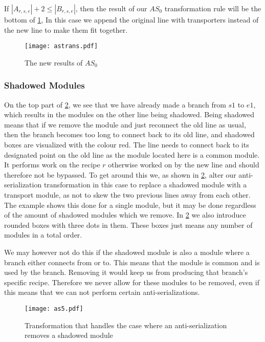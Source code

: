 If $|A_{r,s,e}| + 2 \leq |B_{r,s,e}|$,  then the result of our $AS_0$ transformation rule will be the bottom of \cref{fig:astrans}, In this case we append the original line with transporters instead of the new line to make them fit together.

\begin{figure}[H]
	\centering
	\texttt{[image: astrans.pdf]}
	\caption{The new results of $AS_0$}
	\label{fig:astrans}
\end{figure}

\subsubsection{Shadowed Modules}
On the top part of \cref{fig:shadowexample}, we see that we have already made a branch from $s1$ to $e1$, which results in the modules on the other line being shadowed. Being shadowed means that if we remove the module and just reconnect the old line as usual, then the branch becomes too long to connect back to its old line, and shadowed boxes are visualized with the colour red. The line needs to connect back to its designated point on the old line as the module located here is a common module. It performs work on the recipe $r$ otherwise worked on by the new line and should therefore not be bypassed.  To get around this we, as shown in \cref{fig:shadowexample}, alter our anti-serialization transformation in this case to replace a shadowed module with a transport module, as not to skew the two previous lines away from each other. The example shows this done for a single module, but it may be done regardless of the amount of shadowed modules which we remove. In \cref{fig:shadowexample} we also introduce rounded boxes with three dots in them. These boxes just means any number of modules in a total order.

We may however not do this if the shadowed module is also a module where a branch either connects from or to. This means that the module is common and is used by the branch. Removing it would keep us from producing that branch's specific recipe. Therefore we never allow for these modules to be removed, even if this means that we can not perform certain anti-serializations.

\begin{figure}[H]
	\centering
	\texttt{[image: as5.pdf]}
	\caption{Transformation that handles the case where an anti-serialization removes a shadowed module}
	\label{fig:shadowexample}
\end{figure}

